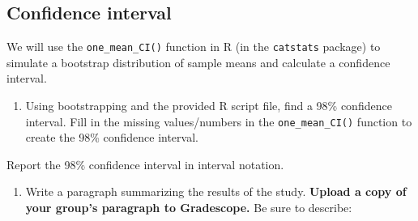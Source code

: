 \documentclass[
]{report}
\newenvironment{Shaded}{\begin{snugshade}}{\end{snugshade}}
\newcommand{\AttributeTok}[1]{\textcolor[rgb]{0.13,0.29,0.53}{#1}}
\newcommand{\CommentTok}[1]{\textcolor[rgb]{0.56,0.35,0.01}{\textit{#1}}}
\newcommand{\DecValTok}[1]{\textcolor[rgb]{0.00,0.00,0.81}{#1}}
\newcommand{\FunctionTok}[1]{\textcolor[rgb]{0.13,0.29,0.53}{\textbf{#1}}}
\newcommand{\NormalTok}[1]{#1}
\newcommand{\SpecialCharTok}[1]{\textcolor[rgb]{0.81,0.36,0.00}{\textbf{#1}}}
\newcommand{\StringTok}[1]{\textcolor[rgb]{0.31,0.60,0.02}{#1}}
\providecommand{\tightlist}{%
  \setlength{\itemsep}{0pt}\setlength{\parskip}{0pt}}
\begin{document}
\vspace{0.8in}

\subsection*{Confidence interval}\label{confidence-interval-1}

We will use the \texttt{one\_mean\_CI()} function in R (in the \texttt{catstats} package) to simulate a bootstrap distribution of sample means and calculate a confidence interval.

\begin{enumerate}
\def\labelenumi{\arabic{enumi}.}
\setcounter{enumi}{12}
\tightlist
\item
  Using bootstrapping and the provided R script file, find a 98\% confidence interval. Fill in the missing values/numbers in the \texttt{one\_mean\_CI()} function to create the 98\% confidence interval.
\end{enumerate}

\begin{Shaded}
\end{Shaded}

Report the 98\% confidence interval in interval notation.

\vspace{0.3in}

\newpage

\begin{enumerate}
\def\labelenumi{\arabic{enumi}.}
\setcounter{enumi}{13}
\tightlist
\item
  Write a paragraph summarizing the results of the study. \textbf{Upload a copy of your group's paragraph to Gradescope.} Be sure to describe:
\end{enumerate}
\end{document}

